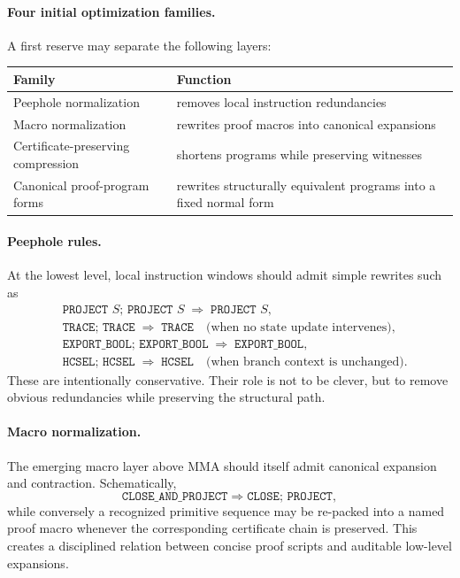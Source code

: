 \documentclass[12pt,a4paper]{article}
\begin{document}
\paragraph{Four initial optimization families.}
A first reserve may separate the following layers:
\begin{center}
\begin{tabular}{@{}>{\raggedright\arraybackslash}p{}>{\raggedright\arraybackslash}p{}@{}}
\toprule
Family & Function \\
\midrule
Peephole normalization & removes local instruction redundancies \\
Macro normalization & rewrites proof macros into canonical expansions \\
Certificate-preserving compression & shortens programs while preserving witnesses \\
Canonical proof-program forms & rewrites structurally equivalent programs into a fixed normal form \\
\bottomrule
\end{tabular}
\end{center}

\paragraph{Peephole rules.}
At the lowest level, local instruction windows should admit simple rewrites such as
\begin{align*}
&\texttt{PROJECT }S;\,\texttt{PROJECT }S \;\Longrightarrow\; \texttt{PROJECT }S,\\
&\texttt{TRACE};\,\texttt{TRACE} \;\Longrightarrow\; \texttt{TRACE} \quad\text{(when no state update intervenes)},\\
&\texttt{EXPORT\_BOOL};\,\texttt{EXPORT\_BOOL} \;\Longrightarrow\; \texttt{EXPORT\_BOOL},\\
&\texttt{HCSEL};\,\texttt{HCSEL} \;\Longrightarrow\; \texttt{HCSEL} \quad\text{(when branch context is unchanged)}.
\end{align*}
These are intentionally conservative. Their role is not to be clever, but to remove obvious redundancies while preserving the structural path.

\paragraph{Macro normalization.}
The emerging macro layer above MMA should itself admit canonical expansion and contraction. Schematically,
\[
\texttt{CLOSE\_AND\_PROJECT}
\Longrightarrow
\texttt{CLOSE};\,\texttt{PROJECT},
\]
while conversely a recognized primitive sequence may be re-packed into a named proof macro whenever the corresponding certificate chain is preserved. This creates a disciplined relation between concise proof scripts and auditable low-level expansions.
\end{document}
